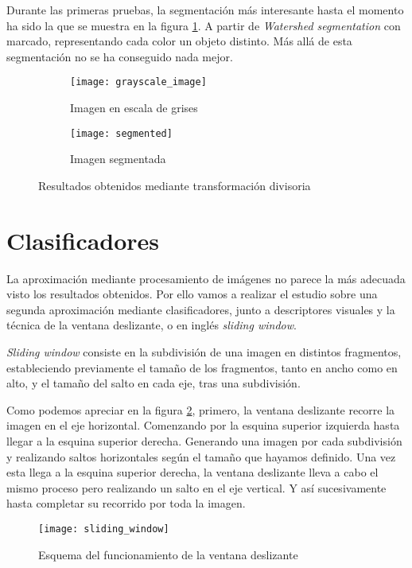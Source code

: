 Durante las primeras pruebas, la segmentación más interesante hasta el momento ha sido la que se muestra en la figura \ref{fig:5.1.3}. A partir de \textit{Watershed segmentation} con marcado, representando cada color un objeto distinto. Más allá de esta segmentación no se ha conseguido nada mejor.

\begin{figure}
	\centering
	\begin{subfigure}[b]{0.45\textwidth}
        \texttt{[image: grayscale\_image]}
        \caption{Imagen en escala de grises}
    \end{subfigure}
    \begin{subfigure}[b]{0.45\textwidth}
        \texttt{[image: segmented]}
        \caption{Imagen segmentada}
    \end{subfigure}
        \caption{Resultados obtenidos mediante transformación divisoria}
	\label{fig:5.1.3}
\end{figure} 	

\section{Clasificadores}

La aproximación mediante procesamiento de imágenes no parece la más adecuada visto los resultados obtenidos. Por ello vamos a realizar el estudio sobre una segunda aproximación  mediante clasificadores, junto a descriptores visuales y la técnica de la ventana deslizante, o en inglés \textit{sliding window}.

\textit{Sliding window} consiste en la subdivisión de una imagen en distintos fragmentos, estableciendo previamente el tamaño de los fragmentos, tanto en ancho como en alto, y el tamaño del salto en cada eje, tras una subdivisión. 

Como podemos apreciar en la figura \ref{fig:sliding_window}, primero, la ventana deslizante recorre la imagen en el eje horizontal. Comenzando por la esquina superior izquierda hasta llegar a la esquina superior derecha. Generando una imagen por cada subdivisión y realizando saltos horizontales según el tamaño que hayamos definido. Una vez esta llega a la esquina superior derecha, la ventana deslizante lleva a cabo el mismo proceso pero realizando un salto en el eje vertical. Y así sucesivamente hasta completar su recorrido por toda la imagen.

\begin{figure}
\centering
\texttt{[image: sliding\_window]}
\caption{Esquema del funcionamiento de la ventana deslizante}
\label{fig:sliding_window}
\end{figure}

